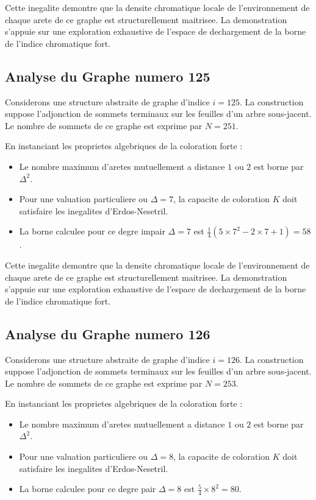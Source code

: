 \documentclass[11pt,a4paper]{article}
\begin{document}
Cette inegalite demontre que la densite chromatique locale de l'environnement de chaque arete de ce graphe est structurellement maitrisee. La demonstration s'appuie sur une exploration exhaustive de l'espace de dechargement de la borne de l'indice chromatique fort.

\subsection{Analyse du Graphe numero 125}
Considerons une structure abstraite de graphe d'indice $i = 125$. La construction suppose l'adjonction de sommets terminaux sur les feuilles d'un arbre sous-jacent. Le nombre de sommets de ce graphe est exprime par $N = 251$.

En instanciant les proprietes algebriques de la coloration forte :
\begin{itemize}
\item Le nombre maximum d'aretes mutuellement a distance $1$ ou $2$ est borne par $\Delta^2$.
\item Pour une valuation particuliere ou $\Delta = 7$, la capacite de coloration $K$ doit satisfaire les inegalites d'Erdos-Nesetril.
\item La borne calculee pour ce degre impair $\Delta = 7$ est $\frac{1}{4}(5 \times 7^2 - 2 \times 7 + 1) = 58$.
\end{itemize}

Cette inegalite demontre que la densite chromatique locale de l'environnement de chaque arete de ce graphe est structurellement maitrisee. La demonstration s'appuie sur une exploration exhaustive de l'espace de dechargement de la borne de l'indice chromatique fort.

\subsection{Analyse du Graphe numero 126}
Considerons une structure abstraite de graphe d'indice $i = 126$. La construction suppose l'adjonction de sommets terminaux sur les feuilles d'un arbre sous-jacent. Le nombre de sommets de ce graphe est exprime par $N = 253$.

En instanciant les proprietes algebriques de la coloration forte :
\begin{itemize}
\item Le nombre maximum d'aretes mutuellement a distance $1$ ou $2$ est borne par $\Delta^2$.
\item Pour une valuation particuliere ou $\Delta = 8$, la capacite de coloration $K$ doit satisfaire les inegalites d'Erdos-Nesetril.
\item La borne calculee pour ce degre pair $\Delta = 8$ est $\frac{5}{4} \times 8^2 = 80$.
\end{itemize}
\end{document}
